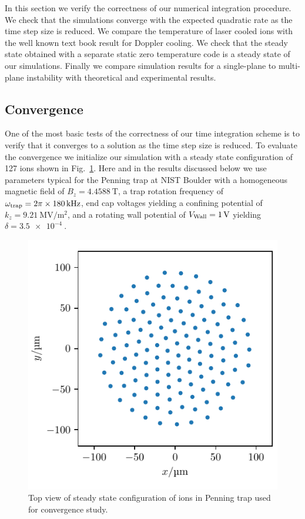 \documentclass[aps, pra, twocolumn]{revtex4-1}
\begin{document}
In this section we verify the correctness of our numerical
integration procedure. We check that the simulations converge
with the expected quadratic rate as the time step size is
reduced. We compare the temperature of laser cooled ions with the
well known text book result for Doppler cooling. We check that
the steady state obtained with a separate static zero temperature
code is a steady state of our simulations. Finally we compare
simulation results for a single-plane to multi-plane instability
with theoretical and experimental results.


\subsection{Convergence}

One of the most basic tests of the correctness of our time
integration scheme is to verify that it converges to a solution
as the time step size is reduced. To evaluate the convergence we
initialize our simulation with a steady state configuration of
127 ions shown in Fig.~\ref{fig:initial_state_top_view}. Here and
in the results discussed below we use parameters typical for the
Penning trap at NIST Boulder with a homogeneous magnetic field of
$B_z=\SI{4.4588}{\tesla}$, a trap rotation frequency of
$\omega_{\rm trap}=2\pi\times \SI{180}{\kilo \hertz}$, end cap
voltages yielding a confining potential of
$k_z=\SI{9.21}{\mega\volt/\meter^2}$, and a rotating wall
potential of $V_{\rm Wall} = \SI{1}{\volt}$ yielding
$\delta=\SI{3.5e-4}{}$.
\begin{figure}
  \includegraphics{./figures/fig_initial_state_top_view.pdf}
  \caption{Top view of steady state configuration of ions in
    Penning trap used for convergence study.}
  \label{fig:initial_state_top_view}
\end{figure}
\end{document}
